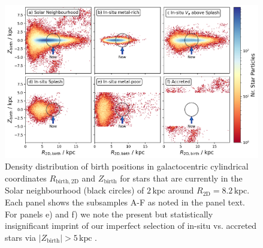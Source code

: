 \documentclass[fleqn,usenatbib]{mnras}
\begin{document}
\begin{figure}
    \centering
    \includegraphics[width=0.997\textwidth]{figures/splash_rbirth_zbirth}
    \caption{Density distribution of birth positions in galactocentric cylindrical coordinates $R_\mathrm{birth, 2D}$ and $Z_\mathrm{birth}$ for stars that are currently in the Solar neighbourhood (black circles) of $2\,\mathrm{kpc}$ around $R_\mathrm{2D} = 8.2\,\mathrm{kpc}$. Each panel shows the subsamples A-F as noted in the panel text. For panels e) and f) we note the present but statistically insignificant imprint of our imperfect selection of in-situ vs. accreted stars via $\vert Z_\mathrm{birth} \vert > 5\,\mathrm{kpc}$  \href{https://github.com/svenbuder/gse_nihaouhd/tree/main/figures}{\faGithub}.}
    \label{fig:splash_rbirth_zbirth}
\end{figure}
\end{document}
